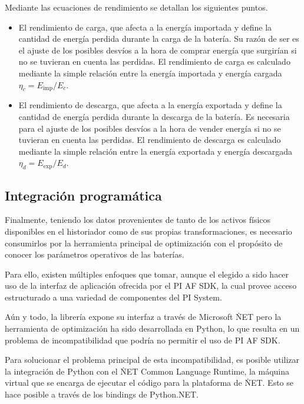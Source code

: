 Mediante las ecuaciones de rendimiento se detallan los siguientes puntos.

\begin{itemize}

  \item El rendimiento de carga, que afecta a la energía importada y define la cantidad de energía perdida durante la carga de la batería. Su razón de ser es el ajuste de los posibles desvíos a la hora de comprar energía que surgirían si no se tuvieran en cuenta las perdidas. El rendimiento de carga es calculado mediante la simple relación entre la energía importada y energía cargada \( \eta_{c} = E_{\text{imp}} / E_{c} \).

  \item El rendimiento de descarga, que afecta a la energía exportada y define la cantidad de energía perdida durante la descarga de la batería. Es necesaria para el ajuste de los posibles desvíos a la hora de vender energía si no se tuvieran en cuenta las perdidas. El rendimiento de descarga es calculado mediante la simple relación entre la energía exportada y energía descargada \( \eta_{d} = E_{\text{exp}} / E_{d} \).

\end{itemize}

\subsection{Integración programática}%
\label{makereference3.5.2}

Finalmente, teniendo los datos provenientes de tanto de los activos físicos disponibles en el historiador como de sus propias transformaciones, es necesario consumirlos por la herramienta principal de optimización con el propósito de conocer los parámetros operativos de las baterías.

Para ello, existen múltiples enfoques que tomar, aunque el elegido a sido hacer uso de la interfaz de aplicación ofrecida por el PI AF SDK, la cual provee acceso estructurado a una variedad de componentes del PI System.

Aún y todo, la librería expone su interfaz a través de Microsoft \.NET pero la herramienta de optimización ha sido desarrollada en Python, lo que resulta en un problema de incompatibilidad que podría no permitir el uso de PI AF SDK\@.

Para solucionar el problema principal de esta incompatibilidad, es posible utilizar la integración de Python con el \.NET Common Language Runtime, la máquina virtual que se encarga de ejecutar el código para la plataforma de \.NET\@. Esto se hace posible a través de los bindings de Python.NET\@.

